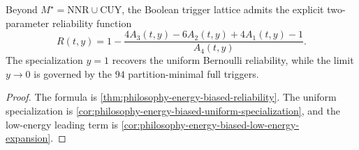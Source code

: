 \begin{theorem}
\label{thm:philosophy-energy-biased-trigger-reliability-theorem}
Beyond $M^{\star}=\mathrm{NNR}\cup\mathrm{CUY}$, the Boolean trigger
lattice admits the explicit two-parameter reliability function
$$
  R(t,y)
  =
  1-
  \frac{
  4A_{3}(t,y)-6A_{2}(t,y)+4A_{1}(t,y)-1
  }{
  A_{4}(t,y)
  }.
$$
The specialization $y=1$ recovers the uniform Bernoulli reliability,
while the limit $y\to0$ is governed by the $94$ partition-minimal full
triggers.
\end{theorem}
\begin{proof}
The formula is \autoref{thm:philosophy-energy-biased-reliability}. The
uniform specialization is
\autoref{cor:philosophy-energy-biased-uniform-specialization}, and the
low-energy leading term is
\autoref{cor:philosophy-energy-biased-low-energy-expansion}.
\end{proof}

